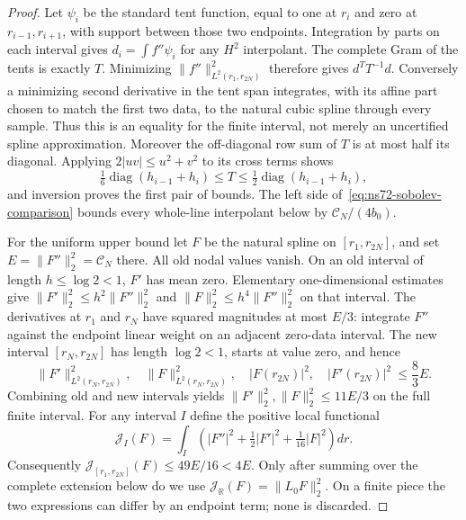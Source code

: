 \documentclass[11pt]{article}
\theoremstyle{remark}
\begin{document}
\begin{proof}
Let $\psi_i$ be the standard tent function, equal to one at $r_i$
and zero at $r_{i-1},r_{i+1}$, with support between those two endpoints.
Integration by parts on each interval gives
$d_i=\int f''\psi_i$ for any $H^2$ interpolant. The complete Gram of
the tents is exactly $T$. Minimizing $\|f''\|_{L^2(r_1,r_{2N})}^2$
therefore gives $d^TT^{-1}d$. Conversely a minimizing second derivative
in the tent span integrates, with its affine part chosen to match the
first two data, to the natural cubic spline through every sample.
Thus this is an equality for the finite interval, not merely an
uncertified spline approximation. Moreover the off-diagonal row sum
of $T$ is at most half its diagonal. Applying
$2|uv|\leq u^2+v^2$ to its cross terms shows
\[
 \tfrac16\operatorname{diag}(h_{i-1}+h_i)
 \leq T\leq\tfrac12\operatorname{diag}(h_{i-1}+h_i),
\]
and inversion proves the first pair of bounds.
The left side of~\eqref{eq:ns72-sobolev-comparison} bounds every
whole-line interpolant below by $\mathcal C_N/(4b_0)$.

For the uniform upper bound let $F$ be the natural spline on
$[r_1,r_{2N}]$, and set $E=\|F''\|_2^2=\mathcal C_N$ there.
All old nodal values vanish. On an old interval of length $h\leq\log2<1$,
$F'$ has mean zero. Elementary one-dimensional estimates give
$\|F'\|_2^2\leq h^2\|F''\|_2^2$ and
$\|F\|_2^2\leq h^4\|F''\|_2^2$ on that interval.
The derivatives at $r_1$ and $r_N$ have squared magnitudes at most
$E/3$: integrate $F''$ against the endpoint linear weight on an
adjacent zero-data interval. The new interval $[r_N,r_{2N}]$ has
length $\log2<1$, starts at value zero, and hence
\[
 \|F'\|_{L^2(r_N,r_{2N})}^2,\quad
 \|F\|_{L^2(r_N,r_{2N})}^2,\quad
 |F(r_{2N})|^2,\quad |F'(r_{2N})|^2\ \leq\frac83 E.
\]
Combining old and new intervals yields
$\|F'\|_2^2,\|F\|_2^2\leq11E/3$ on the full finite interval.
For any interval $I$ define the positive local functional
\[
 \mathcal J_I(F)=\int_I\left(|F''|^2+\tfrac12|F'|^2
                                      +\tfrac1{16}|F|^2\right)dr.
\]
Consequently $\mathcal J_{[r_1,r_{2N}]}(F)\leq49E/16<4E$.
Only after summing over the complete extension below do we use
$\mathcal J_{\mathbb R}(F)=\|L_0F\|_2^2$. On a finite piece the
two expressions can differ by an endpoint term; none is discarded.


\end{proof}
\end{document}

